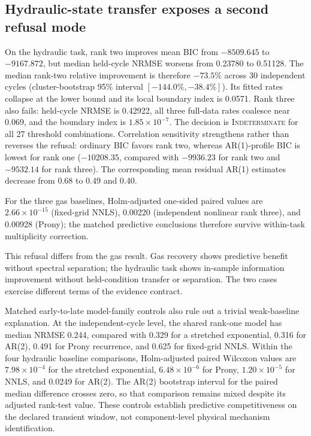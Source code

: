 \documentclass[11pt]{article}
\newcommand{\indet}{\textsc{Indeterminate}}
\begin{document}
\subsection{Hydraulic-state transfer exposes a second refusal mode}
On the hydraulic task, rank two improves mean BIC from $-8509.645$ to $-9167.872$, but median held-cycle NRMSE worsens from 0.23780 to 0.51128. The median rank-two relative improvement is therefore $-73.5\%$ across 30 independent cycles (cluster-bootstrap 95\% interval $[-144.0\%,-38.4\%]$). Its fitted rates collapse at the lower bound and its local boundary index is 0.0571. Rank three also fails: held-cycle NRMSE is 0.42922, all three full-data rates coalesce near 0.069, and the boundary index is $1.85\times10^{-7}$. The decision is \indet{} for all 27 threshold combinations. Correlation sensitivity strengthens rather than reverses the refusal: ordinary BIC favors rank two, whereas AR(1)-profile BIC is lowest for rank one ($-10208.35$, compared with $-9936.23$ for rank two and $-9532.14$ for rank three). The corresponding mean residual AR(1) estimates decrease from 0.68 to 0.49 and 0.40.

 For the three gas baselines, Holm-adjusted one-sided paired values are $2.66\times10^{-15}$ (fixed-grid NNLS), 0.00220 (independent nonlinear rank three), and 0.00928 (Prony); the matched predictive conclusions therefore survive within-task multiplicity correction.

This refusal differs from the gas result. Gas recovery shows predictive benefit without spectral separation; the hydraulic task shows in-sample information improvement without held-condition transfer or separation. The two cases exercise different terms of the evidence contract.

Matched early-to-late model-family controls also rule out a trivial weak-baseline explanation. At the independent-cycle level, the shared rank-one model has median NRMSE 0.244, compared with 0.329 for a stretched exponential, 0.316 for AR(2), 0.491 for Prony recurrence, and 0.625 for fixed-grid NNLS. Within the four hydraulic baseline comparisons, Holm-adjusted paired Wilcoxon values are $7.98\times10^{-4}$ for the stretched exponential, $6.48\times10^{-6}$ for Prony, $1.20\times10^{-5}$ for NNLS, and 0.0249 for AR(2). The AR(2) bootstrap interval for the paired median difference crosses zero, so that comparison remains mixed despite its adjusted rank-test value. These controls establish predictive competitiveness on the declared transient window, not component-level physical mechanism identification.
\end{document}
